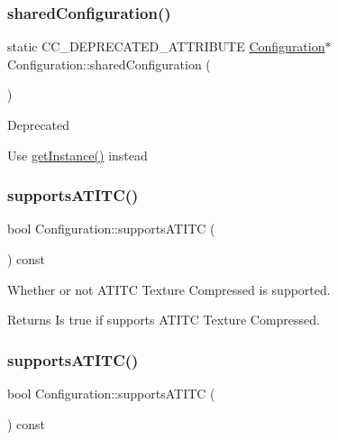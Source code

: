 \subsubsection{\texorpdfstring{shared\+Configuration()}{sharedConfiguration()}\hspace{0.1cm}{\footnotesize\ttfamily [2/2]}}
{\footnotesize\ttfamily static C\+C\+\_\+\+D\+E\+P\+R\+E\+C\+A\+T\+E\+D\+\_\+\+A\+T\+T\+R\+I\+B\+U\+TE \hyperlink{classConfiguration}{Configuration}$\ast$ Configuration\+::shared\+Configuration (\begin{DoxyParamCaption}{ }\end{DoxyParamCaption})\hspace{0.3cm}{\ttfamily [static]}}

\begin{DoxyRefDesc}{Deprecated}
\item[\hyperlink{deprecated__deprecated000284}{Deprecated}]Use \hyperlink{classConfiguration_ae327d26e81014cf46b25802478fe9b8e}{get\+Instance()} instead \end{DoxyRefDesc}
\mbox{\label{classConfiguration_a2db018db47cee9e1794138cd8ebf1c40}} 
\subsubsection{\texorpdfstring{supports\+A\+T\+I\+T\+C()}{supportsATITC()}\hspace{0.1cm}{\footnotesize\ttfamily [1/2]}}
{\footnotesize\ttfamily bool Configuration\+::supports\+A\+T\+I\+TC (\begin{DoxyParamCaption}{ }\end{DoxyParamCaption}) const}

Whether or not A\+T\+I\+TC Texture Compressed is supported.

\begin{DoxyReturn}{Returns}
Is true if supports A\+T\+I\+TC Texture Compressed. 
\end{DoxyReturn}
\mbox{\label{classConfiguration_a2db018db47cee9e1794138cd8ebf1c40}} 
\subsubsection{\texorpdfstring{supports\+A\+T\+I\+T\+C()}{supportsATITC()}\hspace{0.1cm}{\footnotesize\ttfamily [2/2]}}
{\footnotesize\ttfamily bool Configuration\+::supports\+A\+T\+I\+TC (\begin{DoxyParamCaption}{ }\end{DoxyParamCaption}) const}

